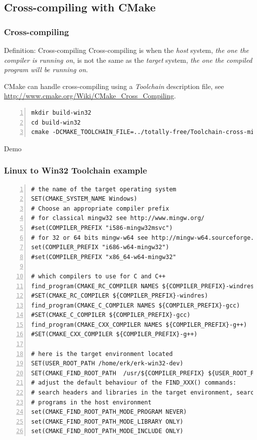 \documentclass[compress,slidestop,table
              ]
               {beamer}
\begin{document}
\subsection{Cross-compiling with CMake}
\begin{frame}[fragile]
\frametitle{Cross-compiling}
\begin{block}{Definition: Cross-compiling}
Cross-compiling is when the \emph{host} system,
\textsl{the one the compiler is running on},
is not the same as the \emph{target} system,
\textsl{the one the compiled program will be running on}.
\end{block}
CMake can handle cross-compiling using a \emph{Toolchain} description file,
see \url{http://www.cmake.org/Wiki/CMake_Cross_Compiling}.
\begin{Verbatim}[fontsize=\tiny,numbers=left]
mkdir build-win32
cd build-win32
cmake -DCMAKE_TOOLCHAIN_FILE=../totally-free/Toolchain-cross-mingw32-linux.cmake ../totally-free/
\end{Verbatim}
\begin{center}
{\Large
\alert{Demo}
}
\end{center}

\end{frame}

\begin{frame}[fragile]
\frametitle{Linux to Win32 Toolchain example}
\begin{lstlisting}[basicstyle=\tiny,numbers=left]
# the name of the target operating system
SET(CMAKE_SYSTEM_NAME Windows)
# Choose an appropriate compiler prefix
# for classical mingw32 see http://www.mingw.org/
#set(COMPILER_PREFIX "i586-mingw32msvc")
# for 32 or 64 bits mingw-w64 see http://mingw-w64.sourceforge.net/
set(COMPILER_PREFIX "i686-w64-mingw32")
#set(COMPILER_PREFIX "x86_64-w64-mingw32"

# which compilers to use for C and C++
find_program(CMAKE_RC_COMPILER NAMES ${COMPILER_PREFIX}-windres)
#SET(CMAKE_RC_COMPILER ${COMPILER_PREFIX}-windres)
find_program(CMAKE_C_COMPILER NAMES ${COMPILER_PREFIX}-gcc)
#SET(CMAKE_C_COMPILER ${COMPILER_PREFIX}-gcc)
find_program(CMAKE_CXX_COMPILER NAMES ${COMPILER_PREFIX}-g++)
#SET(CMAKE_CXX_COMPILER ${COMPILER_PREFIX}-g++)

# here is the target environment located
SET(USER_ROOT_PATH /home/erk/erk-win32-dev)
SET(CMAKE_FIND_ROOT_PATH  /usr/${COMPILER_PREFIX} ${USER_ROOT_PATH})
# adjust the default behaviour of the FIND_XXX() commands:
# search headers and libraries in the target environment, search
# programs in the host environment
set(CMAKE_FIND_ROOT_PATH_MODE_PROGRAM NEVER)
set(CMAKE_FIND_ROOT_PATH_MODE_LIBRARY ONLY)
set(CMAKE_FIND_ROOT_PATH_MODE_INCLUDE ONLY)
\end{lstlisting}
\end{frame}
\end{document}
